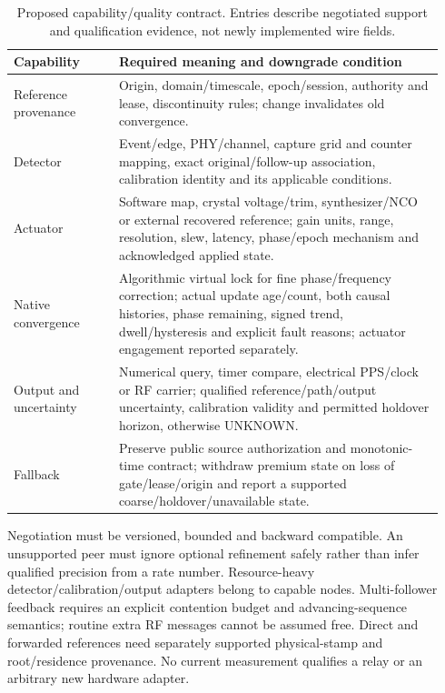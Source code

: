 \documentclass[11pt,letterpaper]{article}
\begin{document}
\begin{table}[h]\centering\small
\caption{Proposed capability/quality contract. Entries describe negotiated support and qualification evidence, not newly implemented wire fields.}\label{tab:caps}
\begin{tabular}{@{}p{0.23\linewidth}p{0.71\linewidth}@{}}\toprule
Capability & Required meaning and downgrade condition\\\midrule
Reference provenance & Origin, domain/timescale, epoch/session, authority and lease, discontinuity rules; change invalidates old convergence.\\
Detector & Event/edge, PHY/channel, capture grid and counter mapping, exact original/follow-up association, calibration identity and its applicable conditions.\\
Actuator & Software map, crystal voltage/trim, synthesizer/NCO or external recovered reference; gain units, range, resolution, slew, latency, phase/epoch mechanism and acknowledged applied state.\\
Native convergence & Algorithmic virtual lock for fine phase/frequency correction; actual update age/count, both causal histories, phase remaining, signed trend, dwell/hysteresis and explicit fault reasons; actuator engagement reported separately.\\
Output and uncertainty & Numerical query, timer compare, electrical PPS/clock or RF carrier; qualified reference/path/output uncertainty, calibration validity and permitted holdover horizon, otherwise UNKNOWN.\\
Fallback & Preserve public source authorization and monotonic-time contract; withdraw premium state on loss of gate/lease/origin and report a supported coarse/holdover/unavailable state.\\\bottomrule
\end{tabular}
\end{table}

Negotiation must be versioned, bounded and backward compatible. An unsupported peer must ignore optional refinement safely rather than infer qualified precision from a rate number. Resource-heavy detector/calibration/output adapters belong to capable nodes. Multi-follower feedback requires an explicit contention budget and advancing-sequence semantics; routine extra RF messages cannot be assumed free. Direct and forwarded references need separately supported physical-stamp and root/residence provenance. No current measurement qualifies a relay or an arbitrary new hardware adapter.
\end{document}
